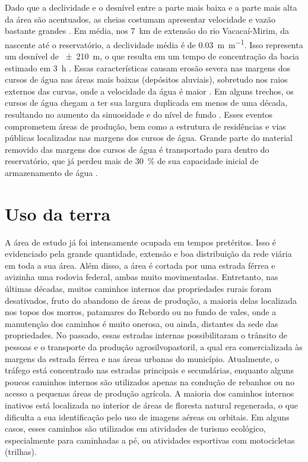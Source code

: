 Dado que a declividade e o desnível entre a parte mais baixa e a parte mais alta da área são acentuados, as 
cheias costumam apresentar velocidade e vazão bastante grandes \cite{PaivaEtAl2001, SutiliEtAl2009}. Em média, 
nos \SI{7}{\km} de extensão do rio Vacacaí-Mirim, da nascente até o reservatório, a declividade média é de 
\SI{0,03}{\m\per\m}. Isso representa um desnível de \SI{\pm210}{\m}, o que resulta em um tempo de concentração 
da bacia estimado em \SI{3}{\hour} \cite{PaivaEtAl2001}. Essas características causam erosão severa nas 
margens dos cursos de água nas áreas mais baixas (depósitos aluviais), sobretudo nos raios externos das 
curvas, onde a velocidade da água é maior \cite{SutiliEtAl2009}. Em alguns trechos, os cursos de água chegam a 
ter sua largura duplicada em menos de uma década, resultando no aumento da sinuosidade e do nível de fundo 
\cite{PaivaEtAl2001}. Esses eventos comprometem áreas de produção, bem como a estrutura de residências e vias 
públicas localizadas nas margens dos cursos de água. Grande parte do material removido das margens dos cursos 
de água é transportado para dentro do reservatório, que já perdeu mais de \SI{30}{\percent} de sua capacidade 
inicial de armazenamento de água \cite{DillEtAl2004}.

\section{Uso da terra}
\label{sec:chap02-landuse}

A área de estudo já foi intensamente ocupada em tempos pretéritos. Isso é evidenciado pela grande quantidade, 
extensão e boa distribuição da rede viária em toda a sua área. Além disso, a área é cortada por uma estrada 
férrea e avizinha uma rodovia federal, ambas muito movimentadas. Entretanto, nas últimas décadas, muitos 
caminhos internos das propriedades rurais foram desativados, fruto do abandono de áreas de produção, a maioria 
delas localizada nos topos dos morros, patamares do Rebordo ou no fundo de vales, onde a manutenção dos 
caminhos é muito onerosa, ou ainda, distantes da sede das propriedades. No passado, essas estradas internas 
possibilitaram o trânsito de pessoas e o transporte da produção agrosilvopastoril, a qual era comercializada 
às margens da estrada férrea e nas áreas urbanas do município. Atualmente, o tráfego está concentrado nas 
estradas principais e secundárias, enquanto alguns poucos caminhos internos são utilizados apenas na condução 
de rebanhos ou no acesso a pequenas áreas de produção agrícola. A maioria dos caminhos internos inativos está 
localizada no interior de áreas de floresta natural regenerada, o que dificulta a sua identificação pelo uso 
de imagens aéreas ou orbitais. Em alguns casos, esses caminhos são utilizados em atividades de turismo 
ecológico, especialmente para caminhadas a pé, ou atividades esportivas com motocicletas (trilhas).

